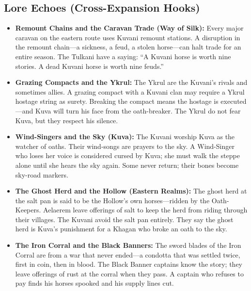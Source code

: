 \subsection*{Lore Echoes (Cross-Expansion Hooks)}
\begin{itemize}
  \item \textbf{Remount Chains and the Caravan Trade (Way of Silk):} Every major caravan on the eastern route uses Kuvani remount stations. A disruption in the remount chain---a sickness, a feud, a stolen horse---can halt trade for an entire season. The Tulkani have a saying: ``A Kuvani horse is worth nine stories. A dead Kuvani horse is worth nine feuds.''
  \item \textbf{Grazing Compacts and the Ykrul:} The Ykrul are the Kuvani's rivals and sometimes allies. A grazing compact with a Kuvani clan may require a Ykrul hostage string as surety. Breaking the compact means the hostage is executed---and Kuva will turn his face from the oath-breaker. The Ykrul do not fear Kuva, but they respect his silence.
  \item \textbf{Wind-Singers and the Sky (Kuva):} The Kuvani worship Kuva as the watcher of oaths. Their wind-songs are prayers to the sky. A Wind-Singer who loses her voice is considered cursed by Kuva; she must walk the steppe alone until she hears the sky again. Some never return; their bones become sky-road markers.
  \item \textbf{The Ghost Herd and the Hollow (Eastern Realms):} The ghost herd at the salt pan is said to be the Hollow's own horses---ridden by the Oath-Keepers. Aelaerem leave offerings of salt to keep the herd from riding through their villages. The Kuvani avoid the salt pan entirely. They say the ghost herd is Kuva's punishment for a Khagan who broke an oath to the sky.
  \item \textbf{The Iron Corral and the Black Banners:} The sword blades of the Iron Corral are from a war that never ended---a condotta that was settled twice, first in coin, then in blood. The Black Banner captains know the story; they leave offerings of rust at the corral when they pass. A captain who refuses to pay finds his horses spooked and his supply lines cut.
\end{itemize}

